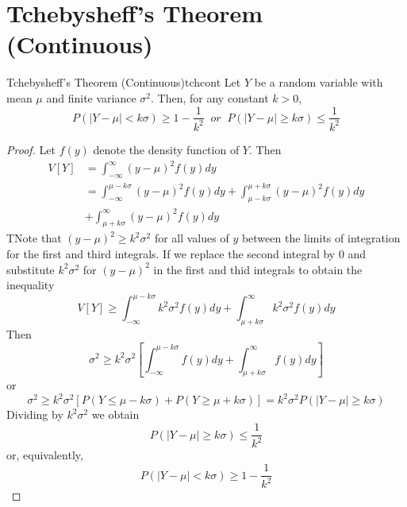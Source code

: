 \documentclass[12pt, a4paper, twoside, openright, titlepage]{book}
\begin{document}
\section{\textsection Tchebysheff's Theorem (Continuous)}

\begin{namthm}{Tchebysheff's Theorem (Continuous)}{tchcont}
    Let $Y$ be a random variable with mean $\mu$ and finite variance $\sigma^2$. Then, for any constant $k > 0$, \begin{equation*}
        P(|Y-\mu|<k\sigma) \geq 1 - \frac{1}{k^2}\;\;or\;\;P(|Y-\mu|\geq k\sigma) \leq \frac{1}{k^2}
    \end{equation*}
\end{namthm}
\begin{proof}{}{}
    Let $f(y)$ denote the density function of $Y$. Then \begin{align*}
        V[Y] &= \int_{-\infty}^{\infty}(y-\mu)^2f(y)dy \\
        &= \int_{-\infty}^{\mu-k\sigma}(y-\mu)^2f(y)dy + \int_{\mu-k\sigma}^{\mu+k\sigma}(y-\mu)^2f(y)dy \\
        &+ \int_{\mu+k\sigma}^{\infty}(y-\mu)^2f(y)dy
    \end{align*}
    TNote that $(y-\mu)^2 \geq k^2\sigma^2$ for all values of $y$ between the limits of integration for the first and third integrals. If we replace the second integral by $0$ and substitute $k^2\sigma^2$ for $(y-\mu)^2$ in the first and thid integrals to obtain the inequality \begin{equation*}
        V[Y] \geq \int_{-\infty}^{\mu-k\sigma}k^2\sigma^2f(y)dy + \int_{\mu+k\sigma}^{\infty}k^2\sigma^2f(y)dy
    \end{equation*}
    Then \begin{equation*}
        \sigma^2 \geq k^2\sigma^2\left[\int_{-\infty}^{\mu-k\sigma}f(y)dy + \int_{\mu+k\sigma}^{\infty}f(y)dy\right]
    \end{equation*}
    or \begin{equation*}
        \sigma^2 \geq k^2\sigma^2[P(Y\leq \mu-k\sigma) +P(Y\geq \mu+k\sigma)] = k^2\sigma^2P(|Y-\mu|\geq k\sigma)
    \end{equation*}
    Dividing by $k^2\sigma^2$ we obtain \begin{equation*}
        P(|Y-\mu|\geq k\sigma) \leq \frac{1}{k^2}
    \end{equation*}
    or, equivalently, \begin{equation*}
        P(|Y-\mu| < k\sigma) \geq 1 - \frac{1}{k^2}
    \end{equation*}
\end{proof}
\end{document}
